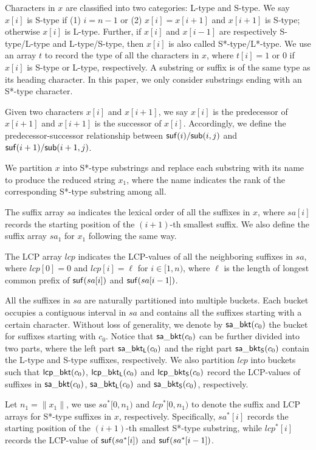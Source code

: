 \documentclass[10pt,journal,compsoc]{IEEEtran}
\begin{document}
Characters in $x$ are classified into two categories: L-type and S-type. We say $x[i]$ is S-type if (1) $i = n - 1$ or (2) $x[i] = x[i + 1]$ and $x[i + 1]$ is S-type; otherwise $x[i]$ is L-type. Further, if $x[i]$ and $x[i - 1]$ are respectively S-type/L-type and L-type/S-type, then $x[i]$ is also called S*-type/L*-type. We use an array $t$ to record the type of all the characters in $x$, where $t[i] = 1$ or $0$ if $x[i]$ is S-type or L-type, respectively. A substring or suffix is of the same type as its heading character. In this paper, we only consider substrings ending with an S*-type character.

Given two characters $x[i]$ and $x[i + 1]$, we say $x[i]$ is the predecessor of $x[i + 1]$ and $x[i + 1]$ is the successor of $x[i]$. Accordingly, we define the predecessor-successor relationship between ${\sf suf}(i)/{\sf sub}(i, j)$ and ${\sf suf}(i + 1)/{\sf sub}(i + 1, j)$.

We partition $x$ into S*-type substrings and replace each substring with its name to produce the reduced string $x_1$, where the name indicates the rank of the corresponding S*-type substring among all.

The suffix array $sa$ indicates the lexical order of all the suffixes in $x$, where $sa[i]$ records the starting position of the $(i + 1)$-th smallest suffix. We also define the suffix array $sa_1$ for $x_1$ following the same way.

The LCP array $lcp$ indicates the LCP-values of all the neighboring suffixes in $sa$, where $lcp[0] = 0$ and $lcp[i] = \ell$ for $i \in [1, n)$, where $\ell$ is the length of longest common prefix of ${\sf suf}(sa[i])$ and ${\sf suf}(sa[i - 1])$.

All the suffixes in $sa$ are naturally partitioned into multiple buckets. Each bucket occupies a contiguous interval in $sa$ and contains all the suffixes starting with a certain character. Without loss of generality, we denote by ${\sf sa\_bkt}(c_0)$ the bucket for suffixes starting with $c_0$. Notice that ${\sf sa\_bkt}(c_0)$ can be further divided into two parts, where the left part ${\sf sa\_bkt_L}(c_0)$ and the right part ${\sf sa\_bkt_S}(c_0)$ contain the L-type and S-type suffixes, respectively. We also partition $lcp$ into buckets such that ${\sf lcp\_bkt}(c_0)$, ${\sf lcp\_bkt_L}(c_0)$ and ${\sf lcp\_bkt_S}(c_0)$ record the LCP-values of suffixes in ${\sf sa\_bkt}(c_0)$, ${\sf sa\_bkt_L}(c_0)$ and ${\sf sa\_bkt_S}(c_0)$, respectively.

Let $n_1 = \|x_1\|$, we use $sa^*[0, n_1)$ and $lcp^*[0, n_1)$ to denote the suffix and LCP arrays for S*-type suffixes in $x$, respectively. Specifically, $sa^*[i]$ records the starting position of the $(i + 1)$-th smallest S*-type substring, while $lcp^*[i]$ records the LCP-value of ${\sf suf}(sa^*[i])$ and ${\sf suf}(sa^*[i - 1])$.
\end{document}
